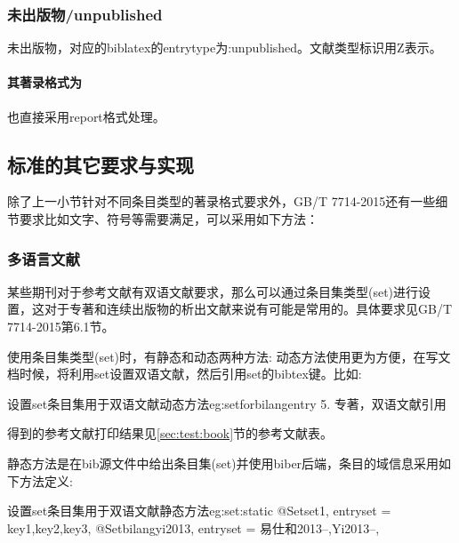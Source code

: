 \subsubsection{未出版物/unpublished}
\begin{refentry}{}{}
未出版物，对应的biblatex的entrytype为:unpublished。文献类型标识用Z表示。

\paragraph{其著录格式为} 也直接采用report格式处理。
\end{refentry}

\subsection{标准的其它要求与实现}

除了上一小节针对不同条目类型的著录格式要求外，GB/T 7714-2015还有一些细节要求比如文字、符号等需要满足，可以采用如下方法：

\subsubsection{多语言文献}

\begin{property}{}{}
某些期刊对于参考文献有双语文献要求，那么可以通过条目集类型(set)进行设置，这对于专著和连续出版物的析出文献来说有可能是常用的。具体要求见GB/T 7714-2015第6.1节。
\end{property}

使用条目集类型(set)时，有静态和动态两种方法:
动态方法使用更为方便，在写文档时候，将利用set设置双语文献，然后引用set的bibtex键。比如:
\begin{codetex}{设置set条目集用于双语文献动态方法}{eg:setforbilangentry}
5. 专著，双语文献引用\cite{bilangyi2013}
\end{codetex}

得到的参考文献打印结果见\ref{sec:test:book}节的参考文献表。

静态方法是在bib源文件中给出条目集(set)并使用biber后端，条目的域信息采用如下方法定义:
\begin{codetex}{设置set条目集用于双语文献静态方法}{eg:set:static}
@Set{set1,
entryset = {key1,key2,key3},
}
@Set{bilangyi2013,
entryset = {易仕和2013--,Yi2013--},
}
\end{codetex}

